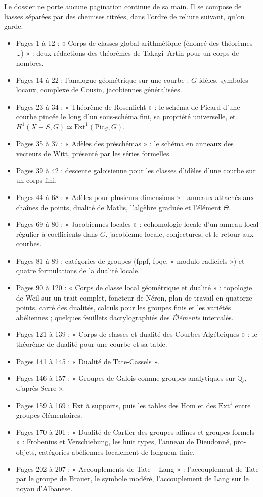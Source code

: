 \documentclass[11pt,a4paper]{article}
\begin{document}
Le dossier ne porte aucune pagination continue de sa main. Il se compose de
liasses séparées par des chemises titrées, dans l'ordre de reliure suivant,
qu'on garde.

\begin{itemize}
\item Pages 1 à 12 : « Corps de classes global arithmétique (énoncé des
théorèmes …) » : deux rédactions des théorèmes de Takagi–Artin pour un corps de
nombres.
\item Pages 14 à 22 : l'analogue géométrique sur une courbe : $G$-idèles,
symboles locaux, complexe de Cousin, jacobiennes généralisées.
\item Pages 23 à 34 : « Théorème de Rosenlicht » : le schéma de Picard d'une
courbe pincée le long d'un sous-schéma fini, sa propriété universelle, et
$H^1(X - S, G) \simeq \mathrm{Ext}^1(\mathrm{Pic}_S, G)$.
\item Pages 35 à 37 : « Adèles des préschémas » : le schéma en anneaux des
vecteurs de Witt, présenté par les séries formelles.
\item Pages 39 à 42 : descente galoisienne pour les classes d'idèles d'une
courbe sur un corps fini.
\item Pages 44 à 68 : « Adèles pour plusieurs dimensions » : anneaux attachés
aux chaînes de points, dualité de Matlis, l'algèbre graduée et l'élément
$\Theta$.
\item Pages 69 à 80 : « Jacobiennes locales » : cohomologie locale d'un anneau
local régulier à coefficients dans $G$, jacobienne locale, conjectures, et le
retour aux courbes.
\item Pages 81 à 89 : catégories de groupes (fppf, fpqc, « modulo radiciels »)
et quatre formulations de la dualité locale.
\item Pages 90 à 120 : « Corps de classe local géométrique et dualité » :
topologie de Weil sur un trait complet, foncteur de Néron, plan de travail en
quatorze points, carré des dualités, calculs pour les groupes finis et les
variétés abéliennes ; quelques feuillets dactylographiés des \emph{Éléments}
intercalés.
\item Pages 121 à 139 : « Corps de classes et dualité des Courbes
Algébriques » : le théorème de dualité pour une courbe et sa table.
\item Pages 141 à 145 : « Dualité de Tate-Cassels ».
\item Pages 146 à 157 : « Groupes de Galois comme groupes analytiques sur
$\mathbb{Q}_\ell$, d'après Serre ».
\item Pages 159 à 169 : $\mathrm{Ext}$ à supports, puis les tables des
$\mathrm{Hom}$ et des $\mathrm{Ext}^1$ entre groupes élémentaires.
\item Pages 170 à 201 : « Dualité de Cartier des groupes affines et groupes
formels » : Frobenius et Verschiebung, les huit types, l'anneau de Dieudonné,
pro-objets, catégories abéliennes localement de longueur finie.
\item Pages 202 à 207 : « Accouplements de Tate -- Lang » : l'accouplement de
Tate par le groupe de Brauer, le symbole modéré, l'accouplement de Lang sur le
noyau d'Albanese.
\end{itemize}
\end{document}
